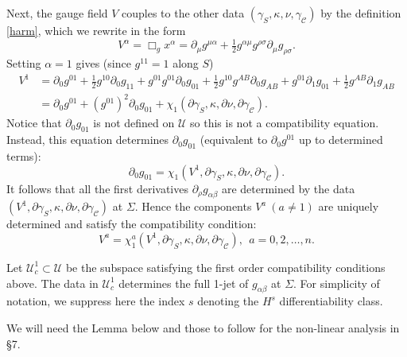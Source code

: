 \documentclass[10pt]{amsart}
\renewcommand{\a}{\alpha}
\renewcommand{\b}{\beta}
\newcommand{\g}{\gamma}
\newcommand{\s}{\sigma}
\newcommand{\Si}{\Sigma}
\renewcommand{\k}{\kappa}
\newcommand{\cC}{{\mathcal C}}
\newcommand{\cU}{{\mathcal U}}
\newcommand{\be}{\begin{equation}}
\newcommand{\ee}{\end{equation}}
\newcommand{\bes}{\begin{equation*}}
\newcommand{\ees}{\end{equation*}}
\newcommand{\p}{\partial}
\newcommand{\<}{\langle}
\renewcommand{\>}{\rangle}
\theoremstyle{plain}
\theoremstyle{remark}
\theoremstyle{definition}
\numberwithin{equation}{section}
\begin{document}
  Next, the gauge field $V$ couples to the other data $(\g_S, \k, \nu, \g_{\cC})$ by the definition \eqref{harm}, which we rewrite in the form 
\be\label{Vg}
V^\a=\Box_g x^\a=\p_\mu g^{\mu\a}+\tfrac{1}{2}g^{\a\mu}g^{\rho\s}\p_\mu g_{\rho\s}.
\ee
Setting $\a=1$ gives (since $g^{11} = 1$ along $S$)  
\bes
\begin{split}
V^1&=\p_0g^{01} + \tfrac{1}{2}g^{10}\p_0 g_{11}+g^{01}g^{01}\p_0 g_{01}+\tfrac{1}{2}g^{10}g^{AB}\p_0 g_{AB} +g^{01}\p_1 g_{01}+\tfrac{1}{2}g^{AB}\p_1 g_{AB}\\
&=\p_0g^{01}+(g^{01})^2\p_0g_{01}+\chi_1(\p \g_S,\k,\p \nu,\p \g_\cC).
\end{split}
\ees
Notice that $\p_0 g_{01}$ is not defined on $\cU$ so this is not a compatibility equation. Instead, this equation determines $\p_0 g_{01}$ (equivalent to $\p_0 g^{01}$ 
up to determined terms):
\bes
\p_0g_{01}=\chi_1(V^1,\p \g_S, \k,\p \nu,\p \g_\cC).
\ees 
It follows that all the first derivatives $\p_\rho g_{\a\b}$ are determined by the data $(V^1,\p \g_S,\k,\p \nu,\p \g_\cC)$ at $\Si$. Hence the components 
$V^a~(a\neq 1)$ are uniquely determined and satisfy the compatibility condition:
\be\label{Va}
V^a=\chi_1^a(V^1,\p \g_S,\k,\p \nu,\p \g_\cC), \ \ a=0,2,\dots, n.
\ee



\medskip 

Let $\cU_c^1 \subset \cU$ be the subspace satisfying the first order compatibility conditions above. The data in $\cU_c^1$ 
determines the full 1-jet of $g_{\a\b}$ at $\Si$. For simplicity of notation, we suppress here the index $s$ denoting the $H^s$ differentiability 
class. 
 
  We will need the Lemma below and those to follow for the non-linear analysis in \S 7. 
 
\end{document}
